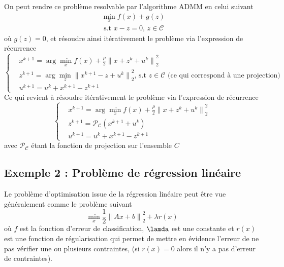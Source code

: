 \documentclass[12pt,a4paper]{report}
\begin{document}
            	On peut rendre ce problème resolvable par l'algorithme ADMM en celui suivant
            	\begin{equation*}
                	\begin{aligned}
                    	& \min_{x} f(x) + g(z) \\
                    	& \text{ s.t  $x - z = 0$, $z \in \mathcal{C}$ }
                	\end{aligned}
            	\end{equation*}
            	où $g(z) = 0$, et résoudre ainsi itérativement le problème via l'expression de récurrence
            	\begin{equation*}
                	\left\{  
                    	\begin{aligned}
                        	& x^{k+1} = \arg\min_{x} f(x) + \frac{\rho}{2}{\| x + z^k + u^k\|}^2_2 \\
                        	& z^{k+1} = \arg\min_{z} {\| x^{k+1} - z + u^k\|}^2_2 \text{, s.t $z \in \mathcal{C}$ (ce qui correspond à une projection)}\\
                        	& u^{k+1} = u^{k} + x^{k+1} - z^{k+1}
                    	\end{aligned}
                	\right.
            	\end{equation*}
            	Ce qui revient à résoudre itérativement le problème via l'expression de récurrence
            	\begin{equation*}
                	\left\{  
                    	\begin{aligned}
                        	& x^{k+1} = \arg\min_{x} f(x) + \frac{\rho}{2}{\| x + z^k + u^k\|}^2_2 \\
                        	& z^{k+1} = \mathcal{P}_\mathcal{C}(x^{k+1} + u^k)\\
                        	& u^{k+1} = u^{k} + x^{k+1} - z^{k+1}
                    	\end{aligned}
                	\right.
            	\end{equation*}
            	avec $\mathcal{P}_\mathcal{C}$ étant la fonction de projection sur l'ensemble $C$

        	\subsection*{Exemple 2 : Problème de régression linéaire}
       	 
            	Le problème d'optimisation issue de la régression linéaire peut être vue généralement comme le problème suivant
            	\begin{equation*}
                	\min_{x} \frac{1}{2}{\| Ax + b \| }_2^2 + \lambda r(x)
            	\end{equation*}
            	où $f$ est la fonction d'erreur de classification, $\lamda$ est une constante et $r(x)$ est une fonction de régularisation qui permet de mettre en évidence l'erreur de ne pas vérifier une ou plusieurs contraintes, (si $r(x)=0$ alors il n'y a pas d'erreur de contraintes).
           	 
\end{document}
